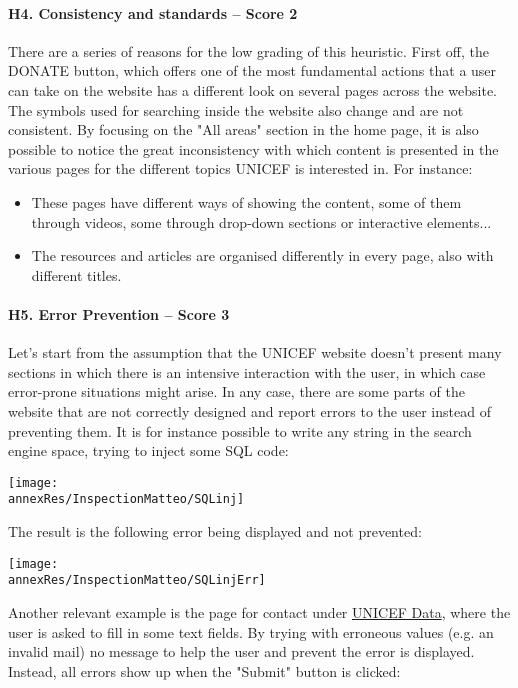 \paragraph*{H4. Consistency and standards  – Score 2}
There are a series of reasons for the low grading of this heuristic.
First off, the DONATE button, which offers one of the most fundamental actions that a user can take on the website has a different look on several pages across the website.
The symbols used for searching inside the website also change and are not consistent.
By focusing on the "All areas" section in the home page, it is also possible to notice the great inconsistency with which content is presented in the various pages for the different topics UNICEF is interested in. For instance:
\begin{itemize}
	\item These pages have different ways of showing the content, some of them through videos, some through drop-down sections or interactive elements...
	\item The resources and articles are organised differently in every page, also with different titles.
	
\end{itemize}

\paragraph*{H5. Error Prevention – Score 3}
Let's start from the assumption that the UNICEF website doesn't present many sections in which there is an intensive interaction with the user, in which case error-prone situations might arise. In any case, there are some parts of the website that are not correctly designed and report errors to the user instead of preventing them.
It is for instance possible to write any string in the search engine space, trying to inject some SQL code:

\begin{center}
	\texttt{[image: \\annexRes/InspectionMatteo/SQLinj]}
\end{center}

\noindent
The result is the following error being displayed and not prevented:

\begin{center}
	\texttt{[image: \\annexRes/InspectionMatteo/SQLinjErr]}
\end{center}

Another relevant example is the page for contact under \href{https://data.unicef.org/contact/}{UNICEF Data}, where the user is asked to fill in some text fields. By trying with erroneous values (e.g. an invalid mail) no message to help the user and prevent the error is displayed. Instead, all errors show up when the "Submit" button is clicked:

